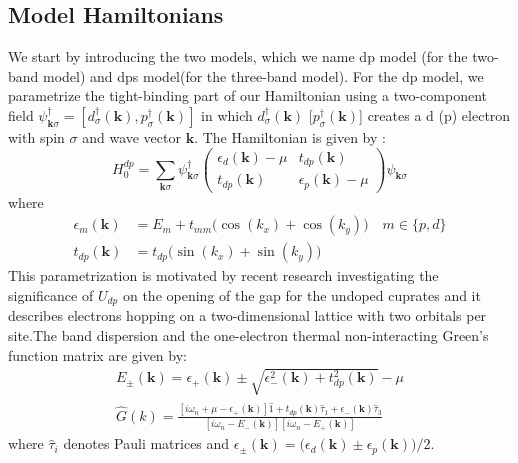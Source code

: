 \documentclass[10pt]{ruthesis}
\begin{document}
{\subsection{Model Hamiltonians}
We start by introducing the two models, which we name dp model (for the two-band model) and dps model(for the three-band model). For the dp model, we parametrize the  tight-binding part of our Hamiltonian using a two-component field $\psi^\dagger_{\mathbf k\sigma}=[d^\dagger_\sigma(\mathbf k),p^\dagger_\sigma(\mathbf k)]$ in which $d^\dagger_\sigma(\mathbf k)$ [$p^\dagger_\sigma(\mathbf k)$] creates a d (p) electron with spin $\sigma$ and wave vector $\mathbf k$. The Hamiltonian is given by : 
\begin{equation}
H^{dp}_0=\sum_{\mathbf{k} \sigma}\psi_{\mathbf k\sigma}^\dagger
 \left(
 \begin{array}{cc}
 \epsilon_d(\mathbf k)-\mu&t_{dp}(\mathbf k)\\
t_{dp}(\mathbf k)&\epsilon_p(\mathbf k)-\mu
 \end{array}
 \right)
\psi_{\mathbf k \sigma}
\end{equation}
where 
\begin{align*}
\epsilon_{m}(\mathbf k)    & =E_m+t_{mm}\big(\cos(k_x)+\cos(k_y)\big)\quad m\in\{p,d\}\\ 
t_{dp}(\mathbf k) & =t_{dp}\big(\sin(k_x)+\sin(k_y)\big) 
\end{align*}
This parametrization is motivated by recent research \cite{NJOP_Udp_in_cuprates_2014_K.Held} investigating the significance of $U_{dp}$ on the opening of the gap for the undoped cuprates and it describes electrons hopping on a two-dimensional lattice with two orbitals per site.The band dispersion and the one-electron thermal non-interacting Green's function matrix are given by:
\begin{align}
E_{\pm}(\mathbf k)=\epsilon_{+}(\mathbf k)\pm\sqrt{\epsilon^2_-(\mathbf k)+t^2_{dp}(\mathbf k)}-\mu\\
\hat G(k)=\frac{[i\omega_n+\mu-\epsilon_+(\mathbf k)]\hat 1+t_{dp}(\mathbf k)\hat \tau_1+\epsilon_-(\mathbf k)\hat \tau_3}{[i\omega_n-E_-(\mathbf k)][i\omega_n-E_+(\mathbf k)]}
\end{align}
where $\hat \tau_i$ denotes Pauli matrices and $\epsilon_{\pm}(\mathbf k) =\big(\epsilon_d(\mathbf k)\pm\epsilon_p(\mathbf k)\big)/2$. 

}
\end{document}
